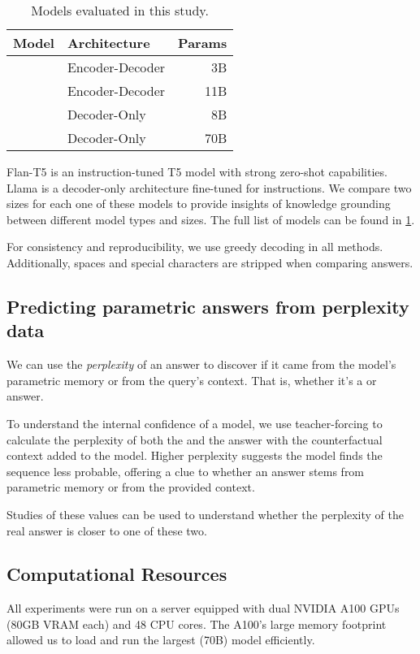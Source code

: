 \begin{table}[b]
	\centering
	\small
	\renewcommand{\arraystretch}{1.2}
	\begin{tabularx}{\columnwidth}{X l r}
		\toprule
			Model             & Architecture    & Params \\
		\midrule
			\smallflan{}      & Encoder-Decoder & 3B          \\[5pt]
			\bigflan{}        & Encoder-Decoder & 11B         \\[5pt]
			\llamaparbox{}    & Decoder-Only    & 8B          \\[10pt]
			\bigllamaparbox{} & Decoder-Only    & 70B         \\[10pt]
		\bottomrule
	\end{tabularx}
	\caption{Models evaluated in this study.}
	\label{models}
\end{table}

Flan-T5 \cite{flant5} is an instruction-tuned T5 model \cite{t5} with strong zero-shot capabilities.
Llama \cite{llama3} is a decoder-only architecture fine-tuned for instructions.
We compare two sizes for each one of these models to provide insights of knowledge grounding between different model types and sizes.
The full list of models can be found in \cref{models}.

For consistency and reproducibility, we use greedy decoding in all methods.
Additionally, spaces and special characters are stripped when comparing answers.

\subsection{Predicting parametric answers from perplexity data}
We can use the \emph{perplexity} of an answer to discover if it came from the model's parametric memory or from the query's context.
That is, whether it's a \Parametric{} or \Contextual{} answer.

To understand the internal confidence of a model, we use teacher-forcing to calculate the perplexity of both the \Parametric{} and the \Contextual{} answer with the counterfactual context added to the model.
Higher perplexity suggests the model finds the sequence less probable, offering a clue to whether an answer stems from parametric memory or from the provided context.

Studies of these values can be used to understand whether the perplexity of the real answer is closer to one of these two.

\subsection{Computational Resources}
All experiments were run on a server equipped with dual NVIDIA A100 GPUs (80GB VRAM each) and 48 CPU cores.
The A100’s large memory footprint allowed us to load and run the largest (70B) model efficiently.
